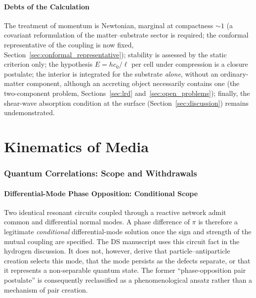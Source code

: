 \documentclass[11pt,a4paper]{article}
\theoremstyle{plain}
\theoremstyle{remark}
\begin{document}
\subsection{Debts of the Calculation}
The treatment of momentum is Newtonian, marginal at compactness $\sim1$ (a covariant reformulation of the matter--substrate sector is required; the conformal representative of the coupling is now fixed, Section~\ref{sec:conformal_representative}); stability is assessed by the static criterion only; the hypothesis $E = hc_0/\ell$ per cell under compression is a closure postulate; the interior is integrated for the substrate \emph{alone}, without an ordinary-matter component, although an accreting object necessarily contains one (the two-component problem, Sections~\ref{sec:lrd} and~\ref{sec:open_problems}); finally, the shear-wave absorption condition at the surface (Section~\ref{sec:discussion}) remains undemonstrated.

\part{Kinematics of Media}

\section{Quantum Correlations: Scope and Withdrawals}
\label{sec:nonlocal_correlations}

\subsection{Differential-Mode Phase Opposition: Conditional Scope}
Two identical resonant circuits coupled through a reactive network admit common and differential normal modes. A phase difference of $\pi$ is therefore a legitimate \emph{conditional} differential-mode solution once the sign and strength of the mutual coupling are specified. The DS manuscript uses this circuit fact in the hydrogen discussion. It does not, however, derive that particle--antiparticle creation selects this mode, that the mode persists as the defects separate, or that it represents a non-separable quantum state. The former ``phase-opposition pair postulate'' is consequently reclassified as a phenomenological ansatz rather than a mechanism of pair creation.
\end{document}
